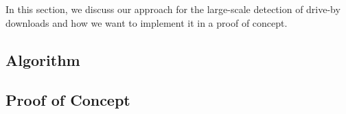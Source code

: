 In this section, we discuss our approach for the large-scale detection of drive-by downloads and how we want to implement it in a proof of concept.

\subsection{Algorithm}


\subsection{Proof of Concept}

